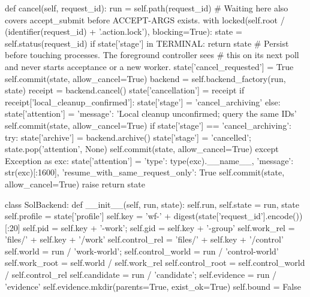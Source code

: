     def cancel(self, request_id):
        run = self.path(request_id)
        # Waiting here also covers accept_submit before ACCEPT-ARGS exists.
        with locked(self.root / (identifier(request_id) + '.action.lock'), blocking=True):
            state = self.status(request_id)
            if state['stage'] in TERMINAL:
                return state
            # Persist before touching processes. The foreground controller sees
            # this on its next poll and never starts acceptance or a new worker.
            state['cancel_requested'] = True
            self.commit(state, allow_cancel=True)
            backend = self.backend_factory(run, state)
            receipt = backend.cancel()
            state['cancellation'] = receipt
            if receipt['local_cleanup_confirmed']:
                state['stage'] = 'cancel_archiving'
            else:
                state['attention'] = {'message': 'Local cleanup unconfirmed; query the same IDs'}
            self.commit(state, allow_cancel=True)
            if state['stage'] == 'cancel_archiving':
                try:
                    state['archive'] = backend.archive()
                    state['stage'] = 'cancelled'; state.pop('attention', None)
                    self.commit(state, allow_cancel=True)
                except Exception as exc:
                    state['attention'] = {'type': type(exc).__name__, 'message': str(exc)[:1600],
                                          'resume_with_same_request_only': True}
                    self.commit(state, allow_cancel=True)
                    raise
            return state


class SolBackend:
    def __init__(self, run, state):
        self.run, self.state = run, state
        self.profile = state['profile']
        self.key = 'wf-' + digest(state['request_id'].encode())[:20]
        self.pid = self.key + '-work'; self.gid = self.key + '-group'
        self.work_rel = 'files/' + self.key + '/work'
        self.control_rel = 'files/' + self.key + '/control'
        self.world = run / 'work-world'; self.control_world = run / 'control-world'
        self.work_root = self.world / self.work_rel
        self.control_root = self.control_world / self.control_rel
        self.candidate = run / 'candidate'; self.evidence = run / 'evidence'
        self.evidence.mkdir(parents=True, exist_ok=True)
        self.bound = False

